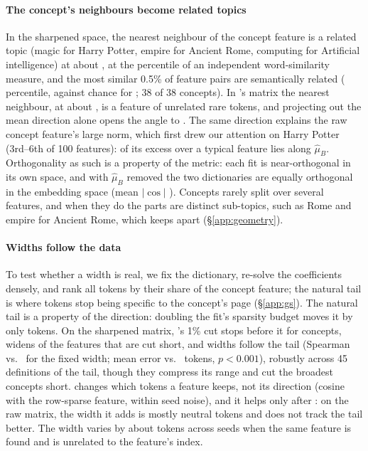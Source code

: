 \paragraph{The concept's neighbours become related topics}
In the sharpened space, the nearest neighbour of the concept feature is a related topic (magic for Harry Potter, empire for Ancient Rome, computing for Artificial intelligence) at about , at the  percentile of an independent word-similarity measure, and the most similar 0.5\% of feature pairs are semantically related ( percentile, against chance for \ember{}; 38 of 38 concepts).
In \ember{}'s matrix the nearest neighbour, at about , is a feature of unrelated rare tokens, and projecting out the mean direction alone opens the angle to .
The same direction explains the raw concept feature's large norm, which first drew our attention on Harry Potter (3rd--6th of 100 features):  of its excess over a typical feature lies along $\hat\mu_B$.
Orthogonality as such is a property of the metric: each fit is near-orthogonal in its own space, and with $\hat\mu_B$ removed the two dictionaries are equally orthogonal in the embedding space (mean $|\cos|$ ).
Concepts rarely split over several features, and when they do the parts are distinct sub-topics, such as Rome and empire for Ancient Rome, which \gs{} keeps apart (\S\ref{app:geometry}).

\paragraph{Widths follow the data}
To test whether a \gs{} width is real, we fix the dictionary, re-solve the coefficients densely, and rank all tokens by their share of the concept feature; the natural tail is where tokens stop being specific to the concept's page (\S\ref{app:gs}).
The natural tail is a property of the direction: doubling the fit's sparsity budget moves it by only  tokens.
On the sharpened matrix, \ember{}'s 1\% cut stops before it for  concepts, \gs{} widens  of the  features that are cut short, and \gs{} widths follow the tail (Spearman  vs.\  for the fixed width; mean error  vs.\  tokens, $p < 0.001$), robustly across 45 definitions of the tail, though they compress its range and cut the broadest concepts short.
\gs{} changes which tokens a feature keeps, not its direction (cosine  with the row-sparse feature, within seed noise), and it helps only after \cs{}: on the raw matrix, the width it adds is mostly neutral tokens and does not track the tail better.
The width varies by about  tokens across seeds when the same feature is found and is unrelated to the feature's index.


